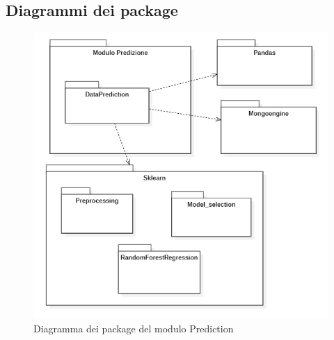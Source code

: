 \subsection{Diagrammi dei package}
\begin{center}
	\begin{figure}[H]
		\centering\includegraphics[scale=0.8]{../immagini/diag_PB/diag_pack_pred.png}
		\caption{Diagramma dei package del modulo Prediction}
	\end{figure}
\end{center}

